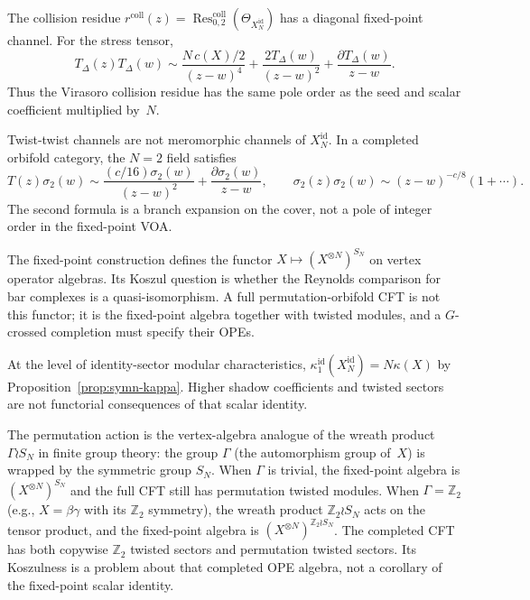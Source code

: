 \begin{remark}
\label{rem:symn-r-matrix}
The collision residue $r^{\mathrm{coll}}(z) =
\operatorname{Res}^{\mathrm{coll}}_{0,2}
(\Theta_{X_N^{\mathrm{id}}})$ has a diagonal fixed-point channel.
For the stress tensor,
\[
 T_\Delta(z)T_\Delta(w)
 \sim
 \frac{N\,c(X)/2}{(z-w)^4}
 + \frac{2T_\Delta(w)}{(z-w)^2}
 + \frac{\partial T_\Delta(w)}{z-w}.
\]
Thus the Virasoro collision residue has the same pole order as the
seed and scalar coefficient multiplied by~$N$.

Twist-twist channels are not meromorphic channels of
$X_N^{\mathrm{id}}$. In a completed orbifold category, the
$N=2$ field satisfies
\[
 T(z)\sigma_2(w)\sim
 \frac{(c/16)\sigma_2(w)}{(z-w)^2}
 +\frac{\partial\sigma_2(w)}{z-w},
 \qquad
 \sigma_2(z)\sigma_2(w)\sim
 (z-w)^{-c/8}(1+\cdots).
\]
The second formula is a branch expansion on the cover, not a pole of
integer order in the fixed-point VOA.
\end{remark}

\begin{remark}\label{rem:symn-orbifold-functor}
The fixed-point construction defines the functor
$X\mapsto (X^{\otimes N})^{S_N}$ on vertex operator algebras. Its
Koszul question is whether the Reynolds comparison for bar complexes
is a quasi-isomorphism. A full permutation-orbifold CFT is not this
functor; it is the fixed-point algebra together with twisted modules,
and a $G$-crossed completion must specify their OPEs.

At the level of identity-sector modular characteristics,
$\kappa^{\mathrm{id}}_1(X_N^{\mathrm{id}})=N\kappa(X)$ by
Proposition~\ref{prop:symn-kappa}. Higher shadow coefficients and
twisted sectors are not functorial consequences of that scalar
identity.
\end{remark}

\begin{remark}
\label{rem:symn-wreath}
The permutation action is the vertex-algebra analogue of the wreath
product $\Gamma \wr S_N$ in finite group theory: the group $\Gamma$
(the automorphism group of~$X$) is wrapped by the symmetric group
$S_N$. When $\Gamma$ is trivial, the fixed-point algebra is
$(X^{\otimes N})^{S_N}$ and the full CFT still has permutation
twisted modules. When
$\Gamma = \mathbb{Z}_2$ (e.g., $X = \beta\gamma$ with its
$\mathbb{Z}_2$ symmetry), the wreath product
$\mathbb{Z}_2 \wr S_N$ acts on the tensor product, and the
fixed-point algebra is $(X^{\otimes N})^{\mathbb Z_2\wr S_N}$.
The completed CFT has both copywise $\mathbb Z_2$ twisted sectors
and permutation twisted sectors. Its Koszulness is a problem about
that completed OPE algebra, not a corollary of the fixed-point
scalar identity.
\end{remark}


